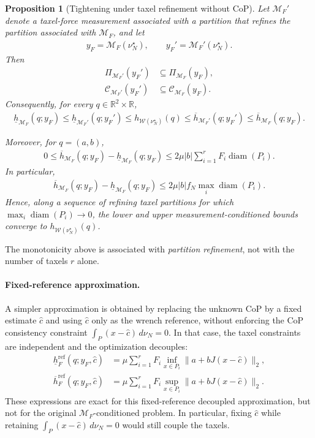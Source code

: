 \documentclass[11pt,a4paper]{article}
\theoremstyle{proposition}
\newtheorem{proposition}[theorem]{Proposition}
\begin{document}
\begin{proposition}[Tightening under taxel refinement without CoP]
\label{prop:taxel_refinement_MF}
Let $\mathcal M_F'$ denote a taxel-force measurement associated with a
partition that refines the partition associated with $\mathcal M_F$, and let
\begin{align}
y_F=\mathcal M_F(\nu_N^\star),
\qquad
y_F'=\mathcal M_F'(\nu_N^\star).
\end{align}
Then
\begin{align}
\Pi_{\mathcal M_F'}(y_F')
&\subseteq
\Pi_{\mathcal M_F}(y_F),\\
\mathcal C_{\mathcal M_F'}(y_F')
&\subseteq
\mathcal C_{\mathcal M_F}(y_F).
\end{align}
Consequently, for every $q\in\mathbb R^2\times\mathbb R$,
\begin{align}
\boxed{
\underline h_{\mathcal M_F}(q;y_F)
\le
\underline h_{\mathcal M_F'}(q;y_F')
\le
h_{\mathcal W(\nu_N^\star)}(q)
\le
\overline h_{\mathcal M_F'}(q;y_F')
\le
\overline h_{\mathcal M_F}(q;y_F).
}
\end{align}

Moreover, for $q=(a,b)$,
\begin{align}
\boxed{
0
\le
\overline h_{\mathcal M_F}(q;y_F)
-
\underline h_{\mathcal M_F}(q;y_F)
\le
2\mu |b|
\sum_{i=1}^r
F_i\operatorname{diam}(P_i).
}
\end{align}
In particular,
\begin{align}
\overline h_{\mathcal M_F}(q;y_F)
-
\underline h_{\mathcal M_F}(q;y_F)
\le
2\mu |b|f_N
\max_i\operatorname{diam}(P_i).
\end{align}
Hence, along a sequence of refining taxel partitions for which
$\max_i\operatorname{diam}(P_i)\rightarrow0$, the lower and upper
measurement-conditioned bounds converge to
$h_{\mathcal W(\nu_N^\star)}(q)$.
\end{proposition}

The monotonicity above is associated with \textit{partition refinement}, not
with the number of taxels $r$ alone.

\paragraph{Fixed-reference approximation.}
A simpler approximation is obtained by replacing the unknown CoP by a fixed
estimate $\hat c$ and using $\hat c$ only as the wrench reference, without
enforcing the CoP consistency constraint
$\int_P(x-\hat c)\,d\nu_N=0$. In that case, the taxel constraints are
independent and the optimization decouples:
\begin{align}
\underline h_F^{\mathrm{ref}}(q;y_F,\hat c)
&=
\mu\sum_{i=1}^r
F_i
\inf_{x\in P_i}
\|a+bJ(x-\hat c)\|_2,\\
\overline h_F^{\mathrm{ref}}(q;y_F,\hat c)
&=
\mu\sum_{i=1}^r
F_i
\sup_{x\in P_i}
\|a+bJ(x-\hat c)\|_2.
\end{align}
These expressions are exact for this fixed-reference decoupled approximation,
but not for the original $\mathcal M_F$-conditioned problem. In particular,
fixing $\hat c$ while retaining
$\int_P(x-\hat c)\,d\nu_N=0$ would still couple the taxels.
\end{document}
